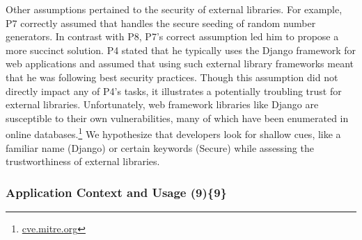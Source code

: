 \documentclass[10pt,journal,compsoc]{IEEEtran}
\begin{document}
Other assumptions pertained to the security of external libraries.
For example, P7 correctly assumed that  handles the secure seeding of random number generators.
In contrast with P8, P7's correct assumption led him to propose a more succinct solution.
P4 stated that he typically uses the Django framework for web applications and assumed that using such external library frameworks meant that he was following best security practices.
Though this assumption did not directly impact any of P4's tasks, it illustrates a potentially troubling trust for external libraries.
Unfortunately, web framework libraries like Django are susceptible to their own vulnerabilities, many of which have been enumerated in online databases.\footnote{\url{cve.mitre.org}}
We hypothesize that developers look for shallow cues, like a familiar name (Django) or certain keywords (Secure) while assessing the trustworthiness of external libraries.




% 


\subsubsection{Application Context and Usage (9)\{9\}}\label{acu}
\end{document}
